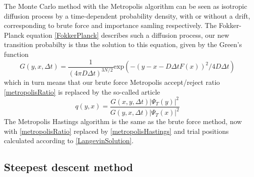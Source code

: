 \documentclass[english, a4paper]{article}
\begin{document}
\noindent The Monte Carlo method with the Metropolis algorithm can be seen as isotropic diffusion process 
by a time-dependent 
probability density, with or without a drift, corresponding to brute force and importance samling respectively.
The Fokker-Planck equation \eqref{FokkerPlanck} describes such a diffusion process, our
new transition probabilty is thus the solution to this equation, given by the Green's function
\begin{equation}
 G(y, x, \Delta t) = \frac{1}{(4\pi D \Delta t)^{3N/2}}
 \textrm{exp}(-(y - x - D\Delta t F(x))^2 / 4D\Delta t)
\end{equation}
which in turn means that our brute force Metropolis accept/reject ratio \eqref{metropolisRatio} is replaced by
the so-called  article
\begin{equation}
 q(y, x) = \frac{G(x, y, \Delta t)|\Psi_T(y)|^2}{G(y, x, \Delta t)|\Psi_T(x)|^2}
 \label{metropolisHastings}
\end{equation}
The Metropolis Hastings algorithm is the same as the brute force method, now with \eqref{metropolisRatio} 
replaced by 
\eqref{metropolisHastings} and trial positions
calculated according to \eqref{LangevinSolution}.




\subsection{Steepest descent method}
\end{document}

